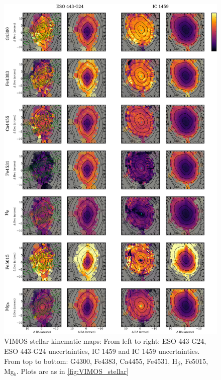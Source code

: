 		\begin{figure}
			\centering
			\includegraphics[height=0.94\textheight]{chapter4/vimos/abs1.png}
			\caption[VIMOS absorption line strength maps]{VIMOS stellar kinematic maps: From left to right: ESO 443-G24, ESO 443-G24 uncertainties, IC 1459 and IC 1459 uncertainties. From top to bottom: G4300, Fe4383, Ca4455, Fe4531, H$_\beta$, Fe5015, Mg$_b$. Plots are as in \ref{fig:VIMOS_stellar}}
			\label{fig:VIMOS_absorption}
		\end{figure}
